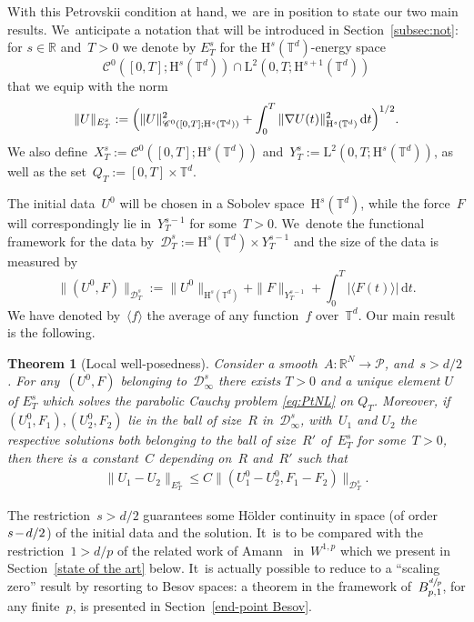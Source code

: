 \documentclass[JEP,XML,SOM,Unicode,published]{cedram}
\newtheorem{thm}{Theorem}
\theoremstyle{definition}
\newcommand\R{\mathbb{R}}
\newcommand\T{\mathbb{T}}
\newcommand\dd{\mathrm{d}}
\renewcommand\H{\mathrm{H}}
\renewcommand\L{\mathrm{L}}
\begin{document}
With this Petrovskii condition at hand, we~are in position to state our two main results. We~anticipate a notation that will be introduced in Section~\ref{subsec:not}: for $s\in\R$ and~$T>0$ we denote by $E_T^s$ for the $\H^s(\T^d)$-energy space
\[
\mathscr{C}^0([0,T];\H^s(\T^d))\cap\L^2(0,T;\H^{s+1}(\T^d))
\]
that we equip with the norm
\[
\|U\|_{E_T^s}:=\Bigl(\|U\|_{\mathscr{C}^0([0,T];\H^s(\T^d))}^2 + \int_0^T \|\nabla U(t)\|_{\H^s(\T^d)}^2\,\dd t\Bigr)^{1/2}.
\]
We also define~$X_T^s:=\mathscr{C}^0([0,T];\H^s(\T^d))$ and~$Y_T^s:=\L^2(0,T;\H^{s}(\T^d))$, as well as the set~$Q_T:=[0,T] \times \T^d$.

The initial data~$U^0 $ will be chosen in a Sobolev space~$ \H^s(\T^d)$, while the force~$F$ will correspondingly lie in~$ Y_T^{s-1}$ for some~$T>0$. We~denote the functional framework for the data by~$
\mathcal D_T^s:= \H^s(\T^d) \times Y_T^{s-1}
$
and the size of the data is measured by
\[
\|(U^0,F)\|_{ \mathcal D_T^s}:= \|U^0\|_{\H^s(\T^d)} + \|F\|_{Y_T^{s-1}} + \int_0^T \left|\langle F(t)\rangle\right|\,\dd t.
\]
We have denoted by~$ \langle f\rangle$ the average of any function~$f$ over~$\T^d$.
Our main result is the following.
\begin{thm}[Local well-posedness] \label{thm:exloc}
Consider a smooth~$A:\R^N\to \mathscr{P}$, and~$s>d/2$. For any~$(U^0,F)$ belonging to~$\mathcal D_\infty^s$ there exists $T>0$ and a unique element $U$ of $E_T^s$ which solves the parabolic Cauchy problem \eqref{eq:PtNL} on $Q_T$. Moreover, if $(U^0_1,F_1),(U^0_2,F_2)$ lie in the ball of size~$R$ in~$\mathcal D_\infty^s$, with~$U_1$ and $U_2$ the respective solutions both belonging to the ball of size~$R'$ of~$E_T^s$ for some~$T>0$, then there is a constant~$C $ depending on~$R$ and~$R'$ such that
\begin{align}\label{eq:stabNL}
\|U_1-U_2\|_{E_T^s} \leq C \big \|(U^0_1-U^0_2,F_1-F_2)\big\|_{ \mathcal D_T^s}.
\end{align}
\end{thm}

The restriction~$s\!>\!d/2$ guarantees some H\"older continuity in space (of order $s\mkern-2mu-\mkern-2mu d/2$) of the initial data and the solution. It~is to be compared with the restriction~$1>d/p$ of the related work of Amann~\cite{amann} in~$W^{1,p}$ which we present in Section~\ref{state of the art} below. It~is actually possible to reduce to a ``scaling zero'' result by resorting to Besov spaces: a theorem in the framework of~$B^{\sfrac dp}_{p,1}$, for any finite~$p$, is presented in Section~\ref{end-point Besov}.
\end{document}
